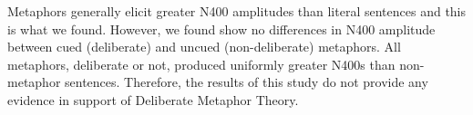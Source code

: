 \documentclass[]{article}
\begin{document}
	Metaphors generally elicit greater N400 amplitudes than literal sentences and this is what we found.
	However, we found show no differences in N400 amplitude between cued (deliberate) and uncued (non-deliberate) metaphors. 
	All metaphors, deliberate or not, produced uniformly greater N400s than non-metaphor sentences. Therefore, the results of this study do not provide any evidence in support of Deliberate Metaphor Theory. 
	

	
\end{document}

